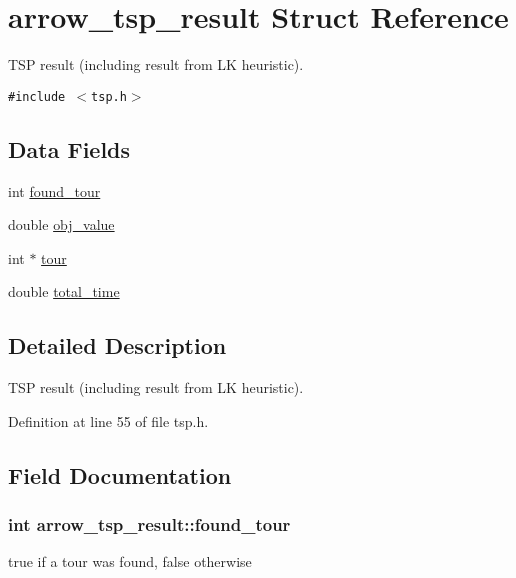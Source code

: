 \hypertarget{structarrow__tsp__result}{
\section{arrow\_\-tsp\_\-result Struct Reference}
\label{structarrow__tsp__result}
}
TSP result (including result from LK heuristic).  


{\tt \#include $<$tsp.h$>$}

\subsection*{Data Fields}
\begin{CompactItemize}
\item 
int \hyperlink{structarrow__tsp__result_b85143df6ecc70032db7411a1aa3192a}{found\_\-tour}
\item 
double \hyperlink{structarrow__tsp__result_f0fae9756e4c924517addf05988cfcb9}{obj\_\-value}
\item 
int $\ast$ \hyperlink{structarrow__tsp__result_48433b03146d6ca3423a555ea2139d52}{tour}
\item 
double \hyperlink{structarrow__tsp__result_82ea7aa0320d932892602d34339a9276}{total\_\-time}
\end{CompactItemize}


\subsection{Detailed Description}
TSP result (including result from LK heuristic). 

Definition at line 55 of file tsp.h.

\subsection{Field Documentation}
\hypertarget{structarrow__tsp__result_b85143df6ecc70032db7411a1aa3192a}{
\subsubsection[{found\_\-tour}]{\setlength{\rightskip}{0pt plus 5cm}int {\bf arrow\_\-tsp\_\-result::found\_\-tour}}}
\label{structarrow__tsp__result_b85143df6ecc70032db7411a1aa3192a}


true if a tour was found, false otherwise 

